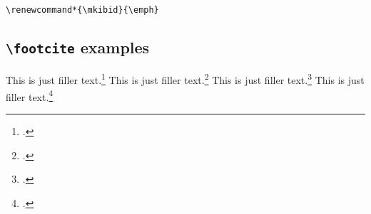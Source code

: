 \documentclass[a4paper]{article}
\newcommand{\cmd}[1]{\texttt{\textbackslash #1}}
\begin{document}
\begin{verbatim}
\renewcommand*{\mkibid}{\emph}
\end{verbatim}

\subsection*{\cmd{footcite} examples}

This is just filler text.\footcite{aristotle:rhetoric}
This is just filler text.\footcite{aristotle:rhetoric}
\clearpage
This is just filler text.\footcite[55]{aristotle:rhetoric}
This is just filler text.\footcite[55]{aristotle:rhetoric}

\clearpage
\printbibliography
\end{document}
